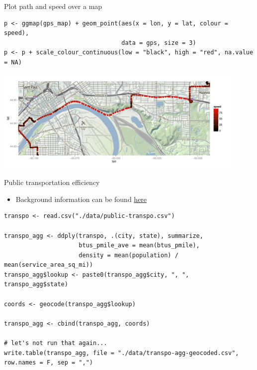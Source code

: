 \documentclass[sans,aspectratio=169,presentation,bigger,fleqn]{beamer}
\begin{document}
\begin{frame}[fragile,label=sec-27]{Plot path and speed over a map}
 \scriptsize

\begin{verbatim}
p <- ggmap(gps_map) + geom_point(aes(x = lon, y = lat, colour = speed),
                                 data = gps, size = 3)
p <- p + scale_colour_continuous(low = "black", high = "red", na.value = NA)
\end{verbatim}

\begin{center}
\includegraphics[height=5cm]{./img/gps-map-over.pdf}
\end{center}

\normalsize
\end{frame}
\begin{frame}[fragile,label=sec-28]{Public transportation efficiency}
 \begin{itemize}
\item Background information can be found \href{https://github.com/tcrug/public-transpo}{here}
\end{itemize}

\scriptsize

\begin{verbatim}
transpo <- read.csv("./data/public-transpo.csv")

transpo_agg <- ddply(transpo, .(city, state), summarize,
                     btus_pmile_ave = mean(btus_pmile),
                     density = mean(population) / mean(service_area_sq_mi))
transpo_agg$lookup <- paste0(transpo_agg$city, ", ", transpo_agg$state)

coords <- geocode(transpo_agg$lookup)

transpo_agg <- cbind(transpo_agg, coords)

# let's not run that again...
write.table(transpo_agg, file = "./data/transpo-agg-geocoded.csv", row.names = F, sep = ",")
\end{verbatim}
\normalsize
\end{frame}
\end{document}
